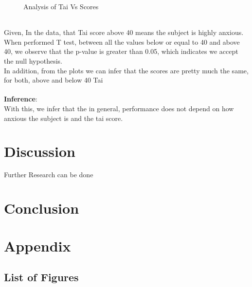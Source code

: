 \documentclass[12pt,epsf]{report}
\begin{document}
{\begin{figure}[!htb]
\begin{minipage}[c]{0.5\linewidth}
	\caption{Analysis of Tai Vs Scores}
	\end{minipage}
\end{figure}\\
Given, In the data, that Tai score above 40 means the subject is highly anxious. When performed T test, between all the values below or equal to 40 and above 40, we observe that the p-value is greater than 0.05, which indicates we accept the null hypothesis.\\
In addition, from the plots we can infer that the scores are pretty much the same, for both, above and below 40 Tai\\
\\
\textbf{Inference}:\\
With this, we infer that the in general, performance does not depend on how anxious the subject is and the tai score.
\FloatBarrier
\section*{Discussion}
Further Research can be done 
\FloatBarrier
\section*{Conclusion}



\newpage
\section*{Appendix}
\subsection*{List of Figures}
}
\end{document}
